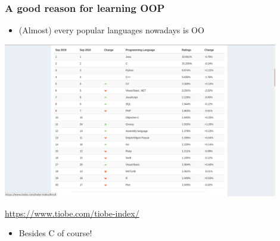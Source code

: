 \documentclass[9pt]{beamer}
\begin{document}
\begin{frame}
  \frametitle{A good reason for learning OOP}
  
  \begin{itemize}
    \item (Almost) every popular languages nowadays is OO
  \end{itemize}
  
  \smallskip
  
  \centering\includegraphics[width=0.9\textwidth]{thiobe.png}
  
  \smallskip
  
  \tiny \url{https://www.tiobe.com/tiobe-index/} \normalsize
  
  \smallskip
  
  \begin{itemize}
    \item Besides C of course!
  \end{itemize}
  
\end{frame}
\end{document}
